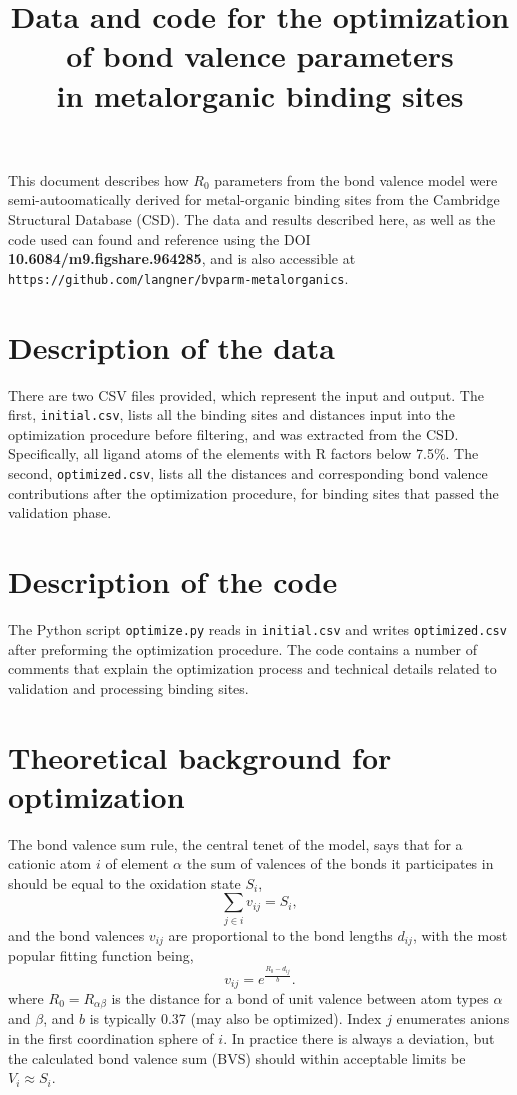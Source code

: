 \documentclass{article}
\begin{document}
\title{Data and code for the optimization of bond valence parameters\\in metalorganic binding sites}
\date{}
\maketitle

This document describes how $R_0$ parameters from the bond valence model were semi-autoomatically derived for metal-organic binding sites from the Cambridge Structural Database (CSD). The data and results described here, as well as the code used can found and reference using the DOI \textbf{10.6084/m9.figshare.964285}, and is also accessible at \texttt{https://github.com/langner/bvparm-metalorganics}.

\section{Description of the data}

There are two CSV files provided, which represent the input and output. The first, \texttt{initial.csv}, lists all the binding sites and distances input into the optimization procedure before filtering, and was extracted from the CSD. Specifically, all ligand atoms of the elements  with R factors below 7.5\%. The second, \texttt{optimized.csv}, lists all the distances and corresponding bond valence contributions after the optimization procedure, for binding sites that passed the validation phase.

\section{Description of the code}

The Python script \texttt{optimize.py} reads in \texttt{initial.csv} and writes \texttt{optimized.csv} after preforming the optimization procedure. The code contains a number of comments that explain the optimization process and technical details related to validation and processing binding sites.

\section{Theoretical background for optimization}

The bond valence sum rule, the central tenet of the model, says that for a cationic atom $i$ of element $\alpha$ the sum of valences of the bonds it participates in should be equal to the oxidation state $S_i$,
$$ \sum_{j \in i} v_{ij} = S_i,$$
and the bond valences $v_{ij}$ are proportional to the bond lengths $d_{ij}$, with the most popular fitting function being,
$$v_{ij} = e^{\frac{R_{0}-d_{ij}}{b}}.$$
where $R_0=R_{\alpha\beta}$ is the distance for a bond of unit valence between atom types $\alpha$ and $\beta$, and $b$ is typically 0.37 (may also be optimized). Index $j$ enumerates anions in the first coordination sphere of $i$. In practice there is always a deviation, but the calculated bond valence sum (BVS) should within acceptable limits be $V_i \approx S_i$.
\end{document}
